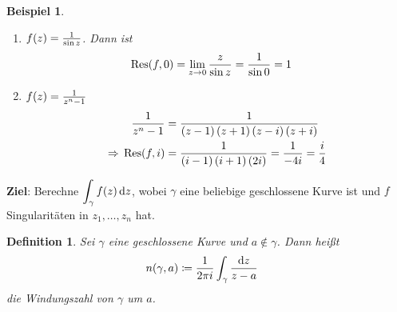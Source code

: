 \documentclass[11pt, a4paper]{article}
\theoremstyle{plain}
\newtheorem{definition}[blockelement]{Definition}
\newtheorem{beispiel}[blockelement]{Beispiel}
\numberwithin{equation}{subsection}
\newcommand{\pair}[1]{\left(#1\right)}
\newcommand{\of}[1]{\mathopen{}\mathclose{}\bgroup\left(#1\aftergroup\egroup\right)}
\newcommand{\impl}[0]{\Rightarrow{}}
\newcommand{\dif}{\mathop{}\!\mathrm{d}}
\newcommand{\dsty}{\displaystyle}
\newcommand{\theoremescape}{\leavevmode}
\DeclareMathOperator{\Res}{Res}
\begin{document}
    \begin{beispiel}
        \theoremescape
        \begin{enumerate}
            \item $f\of{z} = \frac{1}{\sin z}$. Dann ist
            \begin{align*}
                \Res\of{f, 0} &= \lim_{z\to 0} \frac{z}{\sin z} = \frac{1}{\sin 0} = 1
            \end{align*}
            \item $f\of{z} = \frac{1}{z^n-1}$
            \begin{align*}
                \frac{1}{z^n-1} &= \frac{1}{\pair{z-1}\pair{z+1}\pair{z-i}\pair{z+i}}\\
                \impl \Res\of{f, i} &= \frac{1}{\pair{i-1}\pair{i+1}\pair{2i}} = \frac{1}{-4i} = \frac{i}{4}
            \end{align*}
        \end{enumerate}
    \end{beispiel}

    \marginnote{[23. Jun]}

    \noindent\textbf{Ziel}: Berechne $\dsty \int_{\gamma}^{} f\of{z} \dif z$, wobei $\gamma$ eine beliebige geschlossene Kurve ist und $f$ Singularitäten in $z_1, \ldots, z_n$ hat.

    \begin{definition}
        Sei $\gamma$ eine geschlossene Kurve und $a\not\in\gamma$. Dann heißt
        \begin{align*}
            n\of{\gamma, a} &\coloneqq \frac{1}{2\pi i} \int_{\gamma}^{} \frac{\dif z}{z-a}
        \end{align*}
        die Windungszahl von $\gamma$ um $a$.
    \end{definition}
\end{document}
